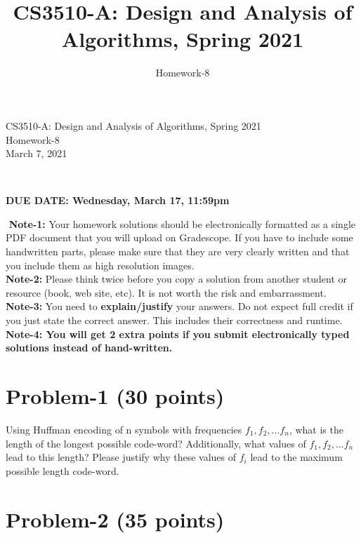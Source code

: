 \documentclass[11pt]{article}
\title{CS3510-A: Design and Analysis of Algorithms, Spring 2021}
\author{Homework-8}
\begin{document}
\begin{center}
    
    \LARGE CS3510-A: Design and Analysis of Algorithms, Spring 2021 \\ \vspace{1em} 
    \large Homework-8 \\ \vspace{0.5em}
    March 7, 2021
\end{center}
\thispagestyle{empty}
\pagestyle{empty}
​
\noindent
\begin{center}
{\bf DUE DATE: Wednesday, March 17, 11:59pm}
\end{center}
​
\noindent
{\bf Note-1:} Your homework solutions should be electronically formatted as a single PDF document that you will upload on Gradescope. 
If you have to include some handwritten parts, please make sure that they are very clearly written and that you include them as high resolution images. \\
​
\noindent
{\bf Note-2:} Please think twice before you copy a solution from another student or resource (book, web site, etc). 
It is not worth the risk and embarrassment. \\
​
\noindent
{\bf Note-3:} You need to {\bf explain/justify} your answers. Do not expect full credit if you just state the correct answer. This includes their correctness and runtime.\\
​
\noindent
{\bf Note-4: You will get 2 extra points if you submit electronically typed solutions instead of hand-written.} 
​
\newpage
\section*{Problem-1 (30 points)}

Using Huffman encoding of n symbols with frequencies $f_1, f_2, ... f_n$, what is the length of the longest possible code-word? Additionally, what values of $f_1, f_2, ... f_n$ lead to this length? Please justify why these values of $f_i$ lead to the maximum possible length code-word.




\newpage
\section*{Problem-2 (35 points)}
\end{document}

